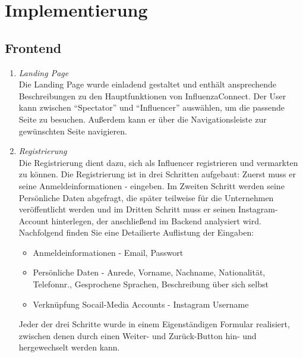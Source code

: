\documentclass[conference,a4paper,flushend]{cs-techrep}
\begin{document}
\section{Implementierung}
\subsection{Frontend}
\begin{enumerate}
\item{\textit{Landing Page}}\\
Die Landing Page wurde einladend gestaltet und enthält ansprechende Beschreibungen zu den Hauptfunktionen von InfluenzaConnect. Der User kann zwischen ``Spectator'' und ``Influencer'' auswählen, um die passende Seite zu
besuchen. Außerdem kann er über die Navigationsleiste zur gewünschten Seite navigieren.
\\
\item{\textit{Registrierung}}\\
Die Registrierung dient dazu, sich als Influencer registrieren und vermarkten zu können. Die Registrierung ist in drei Schritten aufgebaut:
Zuerst muss er seine Anmeldeinformationen - eingeben. Im Zweiten Schritt werden seine Persönliche Daten abgefragt, die später teilweise für die Unternehmen veröffentlicht werden und im Dritten Schritt muss er seinen Instagram-Account hinterlegen, der anschließend im Backend analysiert wird.\\
Nachfolgend finden Sie eine Detailierte Auflistung der Eingaben:
\begin{itemize}
\item{Anmeldeinformationen - Email, Passwort}
\item{Persönliche Daten - Anrede, Vorname, Nachname, Nationalität, Telefonnr., Gesprochene Sprachen, Beschreibung über sich selbst}
\item{Verknüpfung Socail-Media Accounts - Instagram Username}
\end{itemize}
Jeder der drei Schritte wurde in einem Eigenständigen Formular realisiert, zwischen denen durch einen Weiter- und Zurück-Button hin- und hergewechselt werden kann.


\end{enumerate}
\end{document}

